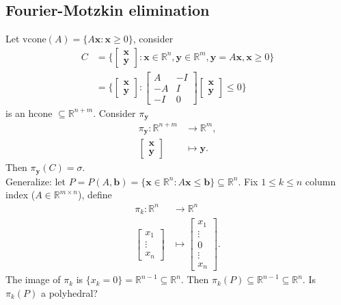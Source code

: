 \documentclass[a4paper,12pt]{amsart}
\newcommand{\RR}{\mathbb{R}}
\newcommand{\bfx}{\mathbf{x}}
\newcommand{\bfy}{\mathbf{y}}
\newcommand{\bfb}{\mathbf{b}}
\begin{document}
\subsection{Fourier-Motzkin elimination}
Let $\text{vcone}(A)=\{A\bfx:\bfx\geq 0\}$, consider
\begin{align*}
C&=\{\begin{bmatrix}\bfx\\\bfy\end{bmatrix}:\bfx\in\RR^n,\bfy\in\RR^m,\bfy=A\bfx,\bfx\geq 0\}\\
&=\{\begin{bmatrix}\bfx\\\bfy\end{bmatrix}:\begin{bmatrix}
A& -I\\
-A& I\\
-I& 0
\end{bmatrix}\begin{bmatrix}\bfx\\\bfy\end{bmatrix}\leq 0\}
\end{align*} 
is an hcone $\subseteq\RR^{n+m}$. Consider $\pi_\bfy$
\begin{align*}
\pi_\bfy:\RR^{n+m}&\rightarrow\RR^{m},\\
\begin{bmatrix}\bfx\\\bfy\end{bmatrix}&\mapsto \bfy.
\end{align*}
Then $\pi_\bfy(C)=\sigma$.\\
Generalize: let $P=P(A,\bfb)=\{\bfx\in \RR^n: A\bfx\leq \bfb\}\subseteq \RR^n$. Fix $1\leq k\leq n$ column index ($A\in\RR^{m\times n}$), define
\begin{align*}
\pi_k:\RR^n&\rightarrow \RR^n\\
\begin{bmatrix}x_1\\ \vdots \\ x_n\end{bmatrix}&\mapsto \begin{bmatrix}
x_1\\
\vdots\\
0\\
\vdots\\
x_n
\end{bmatrix}.
\end{align*}
The image of $\pi_k$ is $\{x_k=0\}=\RR^{n-1}\subseteq\RR^n$. Then $\pi_k(P)\subseteq\RR^{n-1}\subseteq\RR^n$. Is $\pi_k(P)$ a polyhedral? 
\end{document}
